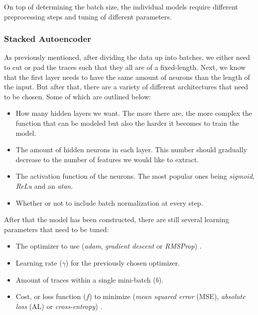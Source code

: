 On top of determining the batch size, the individual models require different preprocessing steps and tuning of different parameters.

\subsubsection{Stacked Autoencoder}

As previously mentioned, after dividing the data up into batches, we either need to cut or pad the traces such that they all are of a fixed-length.
Next, we know that the first layer needs to have the same amount of neurons than the length of the input.
But after that, there are a variety of different architectures that need to be chosen.
Some of which are outlined below:

\newpage

\begin{itemize}
  \item How many hidden layers we want.
    The more there are, the more complex the function that can be modeled but also the harder it becomes to train the model.

  \item The amount of hidden neurons in each layer.
    This number should gradually decrease to the number of features we would like to extract.

  \item The activation function of the neurons.
    The most popular ones being \textit{sigmoid}, \textit{ReLu} and an \textit{atan}.

  \item Whether or not to include batch normalization at every step.
\end{itemize}

After that the model has been constructed, there are still several learning parameters that need to be tuned:

\begin{itemize}
    \item The optimizer to use (\textit{adam}, \textit{gradient descent} or \textit{RMSProp}) \cite{tensorflow}.
    \item Learning rate ($\gamma$) for the previously chosen optimizer.
    \item Amount of traces within a single mini-batch ($b$).
    \item Cost, or loss function ($f$) to minimize (\textit{mean squared error} (MSE), \textit{absolute loss} (AL) or \textit{cross-entropy}) \cite{tensorflow}.
\end{itemize}

